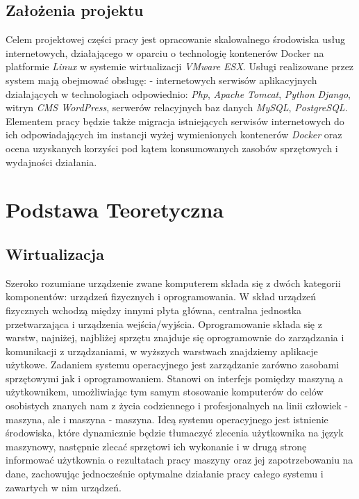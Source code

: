 \documentclass[polish, a4paper, 12pt, oneside]{book}
\begin{document}
\section{Założenia projektu}
Celem projektowej części pracy jest opracowanie skalowalnego środowiska usług internetowych, działającego w oparciu o technologię kontenerów Docker na platformie \textit{Linux} w systemie wirtualizacji \textit{VMware ESX}\cite{vmwareesx}. Usługi realizowane przez system mają obejmować obsługę: - internetowych serwisów aplikacyjnych działających w technologiach odpowiednio: \textit{Php}\cite{php}, \textit{Apache Tomcat}\cite{apachetomcat}, \textit{Python}\cite{python} \textit{Django}\cite{django}, witryn \textit{CMS WordPress}\cite{wordpress}, serwerów relacyjnych baz danych \textit{MySQL}\cite{mysql}, \textit{PostgreSQL}\cite{postgresql}. Elementem pracy będzie także migracja istniejących serwisów internetowych do ich odpowiadających im instancji wyżej wymienionych kontenerów \textit{Docker}\cite{docker} oraz ocena uzyskanych korzyści pod kątem konsumowanych zasobów sprzętowych i wydajności działania. 

\chapter{Podstawa Teoretyczna}
\section{Wirtualizacja}
Szeroko rozumiane urządzenie zwane komputerem składa się z dwóch kategorii komponentów: urządzeń fizycznych i oprogramowania. W skład urządzeń fizycznych wchodzą między innymi płyta główna, centralna jednostka przetwarzająca i urządzenia wejścia/wyjścia. Oprogramowanie składa się z warstw, najniżej, najbliżej sprzętu znajduje się oprogramownie do zarządzania i komunikacji z urządzaniami, w wyższych warstwach znajdziemy aplikacje użytkowe. Zadaniem systemu operacyjnego jest zarządzanie zarówno zasobami sprzętowymi jak i oprogramowaniem. Stanowi on interfejs pomiędzy maszyną a użytkownikem, umożliwiając tym samym stosowanie komputerów do celów osobistych znanych nam z życia codziennego i profesjonalnych na linii człowiek - maszyna, ale i maszyna - maszyna. Ideą systemu operacyjnego jest istnienie środowiska, które dynamicznie będzie tłumaczyć zlecenia użytkownika na język maszynowy, następnie zlecać sprzętowi ich wykonanie i w drugą stronę informować użytkownia o rezultatach pracy maszyny oraz jej zapotrzebowaniu na dane, zachowując jednocześnie optymalne działanie pracy całego systemu i zawartych w nim urządzeń.
   
\end{document}
